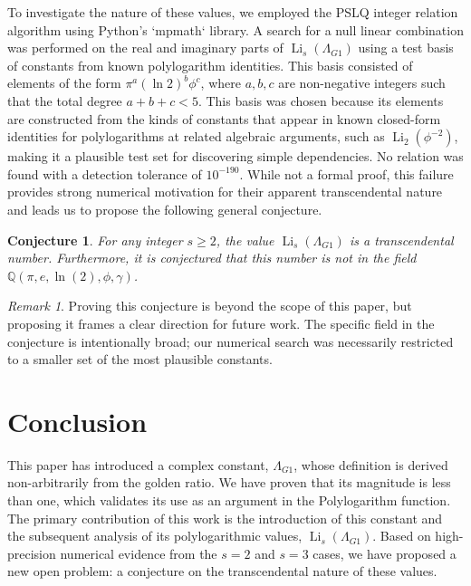 \documentclass{amsart}
\theoremstyle{plain}
\newtheorem{conjecture}[theorem]{Conjecture}
\theoremstyle{definition}
\theoremstyle{remark}
\newtheorem*{remark}{Remark}
\DeclareMathOperator{\Li}{Li} %
\newcommand{\LambdaG}{\Lambda_{G1}}
\newcommand{\phiG}{\phi}
\begin{document}
To investigate the nature of these values, we employed the PSLQ integer relation algorithm using Python's `mpmath` library. A search for a null linear combination was performed on the real and imaginary parts of $\Li_s(\LambdaG)$ using a test basis of constants from known polylogarithm identities. This basis consisted of elements of the form $\pi^a (\ln 2)^b \phi^c$, where $a,b,c$ are non-negative integers such that the total degree $a+b+c < 5$. This basis was chosen because its elements are constructed from the kinds of constants that appear in known closed-form identities for polylogarithms at related algebraic arguments, such as $\Li_2(\phiG^{-2})$, making it a plausible test set for discovering simple dependencies. No relation was found with a detection tolerance of $10^{-190}$. While not a formal proof, this failure provides strong numerical motivation for their apparent transcendental nature and leads us to propose the following general conjecture.
\begin{conjecture}
For any integer $s \ge 2$, the value $\Li_s(\LambdaG)$ is a transcendental number. Furthermore, it is conjectured that this number is not in the field $\mathbb{Q}(\pi, e, \ln(2), \phiG, \gamma)$.
\end{conjecture}
\begin{remark}
Proving this conjecture is beyond the scope of this paper, but proposing it frames a clear direction for future work. The specific field in the conjecture is intentionally broad; our numerical search was necessarily restricted to a smaller set of the most plausible constants.
\end{remark}

\section{Conclusion}
This paper has introduced a complex constant, $\LambdaG$, whose definition is derived non-arbitrarily from the golden ratio. We have proven that its magnitude is less than one, which validates its use as an argument in the Polylogarithm function. The primary contribution of this work is the introduction of this constant and the subsequent analysis of its polylogarithmic values, $\Li_s(\LambdaG)$. Based on high-precision numerical evidence from the $s=2$ and $s=3$ cases, we have proposed a new open problem: a conjecture on the transcendental nature of these values.

\end{document}

